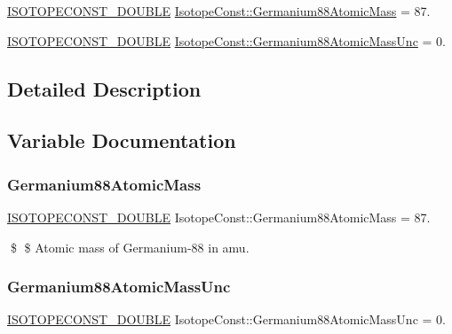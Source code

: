 \begin{DoxyCompactItemize}
\item 
\mbox{\hyperlink{group___isotope_const-_macros_ga8f45a7272ce02c0b4c65c44636ed719a}{I\+S\+O\+T\+O\+P\+E\+C\+O\+N\+S\+T\+\_\+\+D\+O\+U\+B\+LE}} \mbox{\hyperlink{group___isotope_const-_germanium-_ge88_ga352e64809e824bb2d1aac9444c1d0a47}{Isotope\+Const\+::\+Germanium88\+Atomic\+Mass}} = 87.
\item 
\mbox{\hyperlink{group___isotope_const-_macros_ga8f45a7272ce02c0b4c65c44636ed719a}{I\+S\+O\+T\+O\+P\+E\+C\+O\+N\+S\+T\+\_\+\+D\+O\+U\+B\+LE}} \mbox{\hyperlink{group___isotope_const-_germanium-_ge88_ga37fa5f047f89c7d3cf6288f2e219dbcf}{Isotope\+Const\+::\+Germanium88\+Atomic\+Mass\+Unc}} = 0.
\end{DoxyCompactItemize}


\subsection{Detailed Description}


\subsection{Variable Documentation}
\mbox{\label{group___isotope_const-_germanium-_ge88_ga352e64809e824bb2d1aac9444c1d0a47}} 
\subsubsection{\texorpdfstring{Germanium88\+Atomic\+Mass}{Germanium88AtomicMass}}
{\footnotesize\ttfamily \mbox{\hyperlink{group___isotope_const-_macros_ga8f45a7272ce02c0b4c65c44636ed719a}{I\+S\+O\+T\+O\+P\+E\+C\+O\+N\+S\+T\+\_\+\+D\+O\+U\+B\+LE}} Isotope\+Const\+::\+Germanium88\+Atomic\+Mass = 87.}

\$ \$ Atomic mass of Germanium-\/88 in amu. \mbox{\label{group___isotope_const-_germanium-_ge88_ga37fa5f047f89c7d3cf6288f2e219dbcf}} 
\subsubsection{\texorpdfstring{Germanium88\+Atomic\+Mass\+Unc}{Germanium88AtomicMassUnc}}
{\footnotesize\ttfamily \mbox{\hyperlink{group___isotope_const-_macros_ga8f45a7272ce02c0b4c65c44636ed719a}{I\+S\+O\+T\+O\+P\+E\+C\+O\+N\+S\+T\+\_\+\+D\+O\+U\+B\+LE}} Isotope\+Const\+::\+Germanium88\+Atomic\+Mass\+Unc = 0.}


